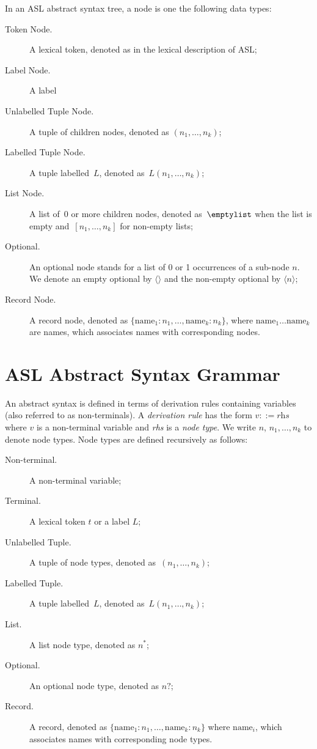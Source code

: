 \documentclass{book}
\begin{document}
In an ASL abstract syntax tree, a node is one the following data types:
\begin{description}
\item[Token Node.] A lexical token, denoted as in the lexical description of ASL;
\item[Label Node.] A label
\item[Unlabelled Tuple Node.] A tuple of children nodes, denoted as $(n_1,\ldots,n_k)$;
\item[Labelled Tuple Node.] A tuple labelled~$L$, denoted as~$L(n_1,\ldots,n_k)$;
\item[List Node.] A list of~$0$ or more children nodes, denoted as~$\emptylist$
when the list is empty and~$[n_1,\ldots,n_k]$ for non-empty lists;
\item[Optional.] An optional node stands for a list of 0 or 1 occurrences of a sub-node $n$. We denote an empty optional by $\langle\rangle$ and the non-empty optional by $\langle n \rangle$;
\item[Record Node.] A record node, denoted as $\{\text{name}_1 : n_1,\ldots,\text{name}_k : n_k\}$, where $\text{name}_1 \ldots \text{name}_k$ are names, which associates names with corresponding nodes.
\end{description}

\newpage

\section{ASL Abstract Syntax Grammar}

An abstract syntax is defined in terms of derivation rules containing variables (also referred to as non-terminals).
%
A \emph{derivation rule} has the form $v ::= \textit{rhs}$ where $v$ is a non-terminal variable and \textit{rhs} is a \emph{node type}. We write $n$, $n_1,\ldots,n_k$ to denote node types.
%
Node types are defined recursively as follows:
\begin{description}
\item[Non-terminal.] A non-terminal variable;
\item[Terminal.] A lexical token $t$ or a label $L$;
\item[Unlabelled Tuple.] A tuple of node types, denoted as~$(n_1,\ldots,n_k)$;
\item[Labelled Tuple.] A tuple labelled~$L$, denoted as~$L(n_1,\ldots,n_k)$;
\item[List.] A list node type, denoted as $n^{*}$;
\item[Optional.] An optional node type, denoted as $n?$;
\item[Record.] A record, denoted as $\{\text{name}_1 : n_1,\ldots,\text{name}_k : n_k\}$ where $\text{name}_i$, which associates names with corresponding node types.
\end{description}
\end{document}
